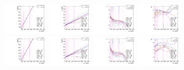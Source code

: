 \begin{figure}[htbp]
  \includegraphics[width=0.2\textwidth]{fig/analysisAppendix/paramSignalShape_allSig_MVV_HP_nobb_LDy_MEAN.pdf}
  \includegraphics[width=0.2\textwidth]{fig/analysisAppendix/paramSignalShape_allSig_MVV_HP_nobb_LDy_SIGMA.pdf}
  \includegraphics[width=0.2\textwidth]{fig/analysisAppendix/paramSignalShape_allSig_MVV_HP_nobb_LDy_ALPHA1.pdf}
  \includegraphics[width=0.2\textwidth]{fig/analysisAppendix/paramSignalShape_allSig_MVV_HP_nobb_LDy_ALPHA2.pdf}\\
  \includegraphics[width=0.2\textwidth]{fig/analysisAppendix/paramSignalShape_allSig_MVV_LP_nobb_LDy_MEAN.pdf}
  \includegraphics[width=0.2\textwidth]{fig/analysisAppendix/paramSignalShape_allSig_MVV_LP_nobb_LDy_SIGMA.pdf}
  \includegraphics[width=0.2\textwidth]{fig/analysisAppendix/paramSignalShape_allSig_MVV_LP_nobb_LDy_ALPHA1.pdf}
  \includegraphics[width=0.2\textwidth]{fig/analysisAppendix/paramSignalShape_allSig_MVV_LP_nobb_LDy_ALPHA2.pdf}\\

\end{figure}
